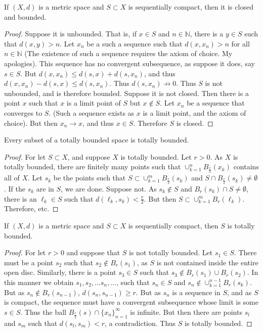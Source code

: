 \documentclass[crop=false,class=article,oneside]{standalone}
\begin{document}
        \begin{theorem}
        If $(X,d)$ is a metric space and $S\subset X$ is sequentially compact, then it is closed and bounded.
        \end{theorem}
        \begin{proof}
        \item Suppose it is unbounded. That is, if $x\in S$ and $n\in \mathbb{N}$, there is a $y\in S$ such that $d(x,y)>n$. Let $x_n$ be a such a sequence such that $d(x,x_n)>n$ for all $n\in \mathbb{N}$ (The existence of such a sequence requires the axiom of choice. My apologies). This sequence has no convergent subsequence, as suppose it does, say $s\in S$. But $d(x,x_n) \leq d(s,x)+d(s,x_n)$, and thus $d(x,x_n)-d(s,x)\leq d(s,x_n)$. Thus $d(s,x_n) \not\rightarrow 0$. Thus $S$ is not unbounded, and is therefore bounded. Suppose it is not closed. Then there is a point $x$ such that $x$ is a limit point of $S$ but $x\notin S$. Let $x_n$ be a sequence that converges to $S$. (Such a sequence exists as $x$ is a limit point, and the axiom of choice). But then $x_n \rightarrow x$, and thus $x\in S$. Therefore $S$ is closed.
        \end{proof}
        \begin{theorem}
        Every subset of a totally bounded space is totally bounded.
        \end{theorem}
        \begin{proof}
        For let $S\subset X$, and suppose $X$ is totally bounded. Let $r>0$. As $X$ is totally bounded, there are finitely many points such that $\cup_{k=1}^{n} B_{\frac{r}{2}}(x_k)$ contains all of $X$. Let $s_k$ be the points such that $S\subset \cup_{k=1}^{m} B_{\frac{r}{2}}(s_k)$ and $S\cap B_{\frac{r}{2}}(s_k) \ne \emptyset$. If the $s_k$ are in $S$, we are done. Suppose not. As $s_k \notin S$ and $B_{r}(s_k)\cap S \ne \emptyset$, there is an $\ell_k \in S$ such that $d(\ell_k,s_k)< \frac{r}{2}$. But then $S\subset \cup_{k=1}^{m} B_{r}(\ell_k)$. Therefore, etc.
        \end{proof}
        \begin{theorem}
        If $(X,d)$ is a metric space and $S\subset X$ is sequentially compact, then $S$ is totally bounded.
        \end{theorem}
        \begin{proof}
        For let $r>0$ and suppose that $S$ is not totally bounded. Let $s_1\in S$. There must be a point $s_2$ such that $s_2 \notin B_{r}(s_1)$, as $S$ is not contained inside the entire open disc. Similarly, there is a point $s_3\in S$ such that $s_3 \notin B_r(s_1)\cup B_r(s_2)$. In this manner we obtain $s_1, s_2, \hdots s_n, \hdots$, such that $s_n \in S$ and $s_n \notin \cup_{k=1}^{n-1}B_r(s_k)$. But as $s_n \notin B_r(s_{n-1})$, $d(s_n, s_{n-1})\geq r$. But as $s_n$ is a sequence in $S$, and as $S$ is compact, the sequence must have a convergent subsequence whose limit is some $s\in S$. Thus the ball $B_{\frac{r}{2}}(s)\cap \{x_n\}_{n=1}^{\infty}$ is infinite. But then there are points $s_{l}$ and $s_{m}$ such that $d(s_l,s_m)<r$, a contradiction. Thus $S$ is totally bounded.
        \end{proof}
\end{document}
